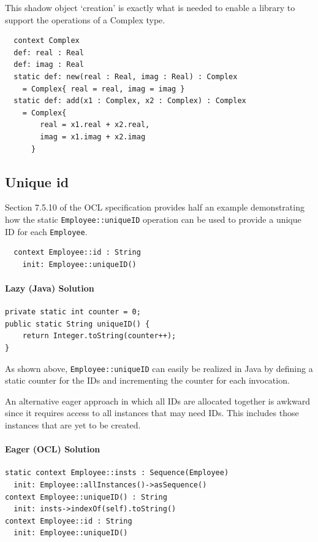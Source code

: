 \documentclass[sigconf]{acmart}
\begin{document}
This shadow object `creation' is exactly what is needed to enable a library to support the operations of a Complex type.

\begin{verbatim}
  context Complex
  def: real : Real
  def: imag : Real
  static def: new(real : Real, imag : Real) : Complex
    = Complex{ real = real, imag = imag }
  static def: add(x1 : Complex, x2 : Complex) : Complex
    = Complex{
        real = x1.real + x2.real,
        imag = x1.imag + x2.imag
      }
\end{verbatim} 

\subsection{Unique id}\label{UniqueId}

Section 7.5.10 of the OCL specification provides half an example demonstrating how the static \verb|Employee::uniqueID| operation can be used to provide a unique ID for each \verb|Employee|.
\begin{verbatim}
  context Employee::id : String
    init: Employee::uniqueID()
\end{verbatim} 

\paragraph{Lazy (Java) Solution}

\begin{verbatim}
private static int counter = 0;
public static String uniqueID() {
    return Integer.toString(counter++);
}
\end{verbatim} 

As shown above, \verb|Employee::uniqueID| can easily be realized in Java by defining a static counter for the IDs and incrementing the counter for each invocation.

An alternative eager approach in which all IDs are allocated together is awkward since it requires access to all instances that may need IDs. This includes those instances that are yet to be created.

\paragraph{Eager (OCL) Solution}

\begin{verbatim}
static context Employee::insts : Sequence(Employee)
  init: Employee::allInstances()->asSequence()
context Employee::uniqueID() : String
  init: insts->indexOf(self).toString()
context Employee::id : String
  init: Employee::uniqueID()
\end{verbatim} 
\end{document}
